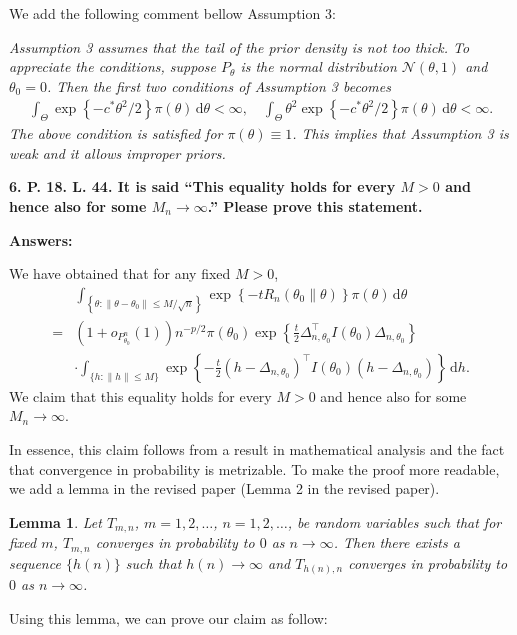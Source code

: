 \documentclass[11pt]{article}
\theoremstyle{plain}
\newtheorem*{lemma}{\quad\quad Lemma}
\theoremstyle{definition}
\theoremstyle{remark}
\begin{document}
We add the following comment bellow Assumption 3:

\begin{adjustwidth}{1.5em}{1.5em}
    \emph{
        Assumption 3 assumes that the tail of the prior density is not too thick.
            To appreciate  the conditions,
            suppose $P_\theta$ is the  normal distribution $ \mathcal N( \theta, 1  )$ and $\theta_0 = 0$.
            Then the first two conditions of Assumption 3 becomes
            \begin{align*}
                    \int_{\Theta} \exp\left\{ -c^* \theta^2 /2 \right\} \pi (\theta) \, \mathrm d \theta < \infty,
                    \quad
                    \int_{\Theta}  \theta^2 \exp\left\{ -c^* \theta^2 /2 \right\} \pi (\theta) \, \mathrm d \theta < \infty.
            \end{align*}
            The above condition is satisfied for $\pi(\theta) \equiv 1$.
            This implies that Assumption 3 is weak and it allows improper priors.
    }
\end{adjustwidth}

\textbf{
6.
P. 18. L. 44.
It is said ``This equality holds for every $M>0$ and hence also for some $M_n \to \infty$.''
Please prove this statement.
}

\textbf{Answers:}

We have obtained that for any fixed $M>0$, 
    \begin{align*}
    & \int_{\left\{ \theta: \|\theta - \theta_0\| \leq M/\sqrt n \right\} }
    \exp \left\{-t R_n(\theta_0\| \theta) \right\} \pi(\theta)
    \, \mathrm d \theta
        \\
        =&
        (1+o_{P^n_{\theta_0}}(1))
        n^{-p/2}\pi(\theta_0)
        \exp\left\{ 
                \frac{t}{2}\Delta_{n,\theta_0}^\top  I({\theta_0})\Delta_{n,\theta_0}
        \right\}
        \\
        &
        \cdot
        \int_{\{h:\|h\|\leq M\}}\exp\left\{ -\frac{t}{2}(h-\Delta_{n,\theta_0})^\top  I({\theta_0})(h-\Delta_{n,\theta_0})\right\} \, \mathrm dh
        .
\end{align*}
We claim that this equality holds for every $M>0$ and hence also for some $M_n \to \infty$.

In essence, this claim follows from a result in mathematical analysis and the fact that convergence in probability is metrizable.
To make the proof more readable, we add a lemma in the revised paper (Lemma 2 in the revised paper).
\begin{lemma}
        Let $T_{m,n}$, $m = 1, 2,\dots$, $n = 1, 2,\dots$, be random variables such that for fixed $m$, $T_{m,n}$ converges in probability to $0$ as $n \to \infty$.
        Then there exists a sequence $\{h(n)\}$ such that $h(n) \to \infty$ and $T_{h(n), n}$ converges in probability to $0$ as $n \to \infty$.
        \label{lemma:MN}
\end{lemma}
Using this lemma, we can prove our claim as follow:
\end{document}
